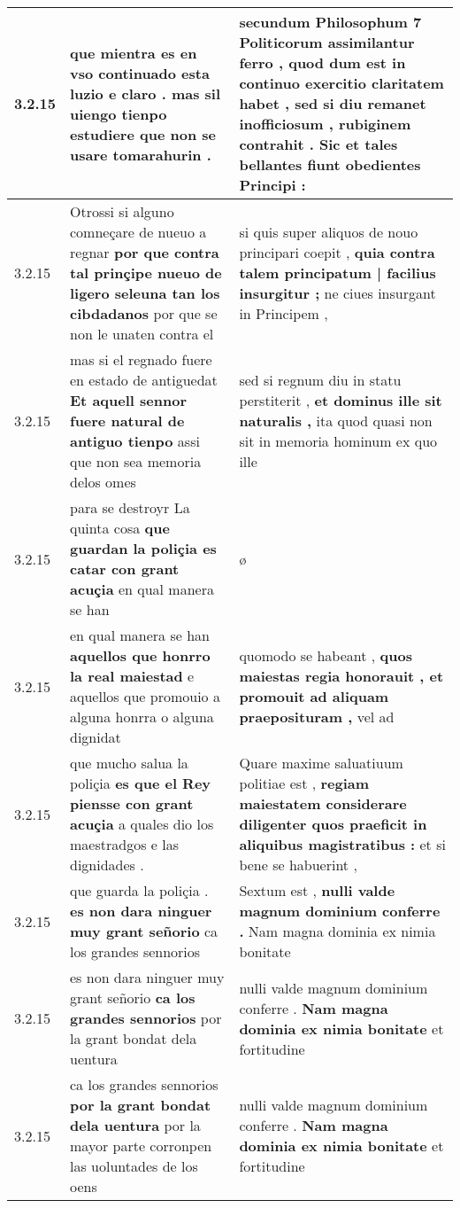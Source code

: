 \begin{tabular}{|p{1cm}|p{6.5cm}|p{6.5cm}|}
3.2.15 & que mientra es en vso continuado esta luzio e claro . \textbf{ mas sil uiengo tienpo estudiere } que non se usare tomarahurin . & secundum Philosophum 7 Politicorum assimilantur ferro , \textbf{ quod dum est in continuo exercitio claritatem habet , } sed si diu remanet inofficiosum , rubiginem contrahit . Sic et tales bellantes fiunt obedientes Principi : \\\hline
3.2.15 & Otrossi si alguno comneçare de nueuo a regnar \textbf{ por que contra tal prinçipe nueuo de ligero seleuna tan los cibdadanos } por que se non le unaten contra el & si quis super aliquos de nouo principari coepit , \textbf{ quia contra talem principatum | facilius insurgitur ; } ne ciues insurgant in Principem , \\\hline
3.2.15 & mas si el regnado fuere en estado de antiguedat \textbf{ Et aquell sennor fuere natural de antiguo tienpo } assi que non sea memoria delos omes & sed si regnum diu in statu perstiterit , \textbf{ et dominus ille sit naturalis , } ita quod quasi non sit in memoria hominum ex quo ille \\\hline
3.2.15 & para se destroyr La quinta cosa \textbf{ que guardan la poliçia es catar con grant acuçia } en qual manera se han & ø \\\hline
3.2.15 & en qual manera se han \textbf{ aquellos que honrro la real maiestad } e aquellos que promouio a alguna honrra o alguna dignidat & quomodo se habeant , \textbf{ quos maiestas regia honorauit , et promouit ad aliquam praeposituram , } vel ad \\\hline
3.2.15 & que mucho salua la poliçia \textbf{ es que el Rey piensse con grant acuçia } a quales dio los maestradgos e las dignidades . & Quare maxime saluatiuum politiae est , \textbf{ regiam maiestatem considerare diligenter quos praeficit in aliquibus magistratibus : } et si bene se habuerint , \\\hline
3.2.15 & que guarda la poliçia . \textbf{ es non dara ninguer muy grant señorio } ca los grandes sennorios & Sextum est , \textbf{ nulli valde magnum dominium conferre . } Nam magna dominia ex nimia bonitate \\\hline
3.2.15 & es non dara ninguer muy grant señorio \textbf{ ca los grandes sennorios } por la grant bondat dela uentura & nulli valde magnum dominium conferre . \textbf{ Nam magna dominia ex nimia bonitate } et fortitudine \\\hline
3.2.15 & ca los grandes sennorios \textbf{ por la grant bondat dela uentura } por la mayor parte corronpen las uoluntades de los oens & nulli valde magnum dominium conferre . \textbf{ Nam magna dominia ex nimia bonitate } et fortitudine \\\hline

\end{tabular}
